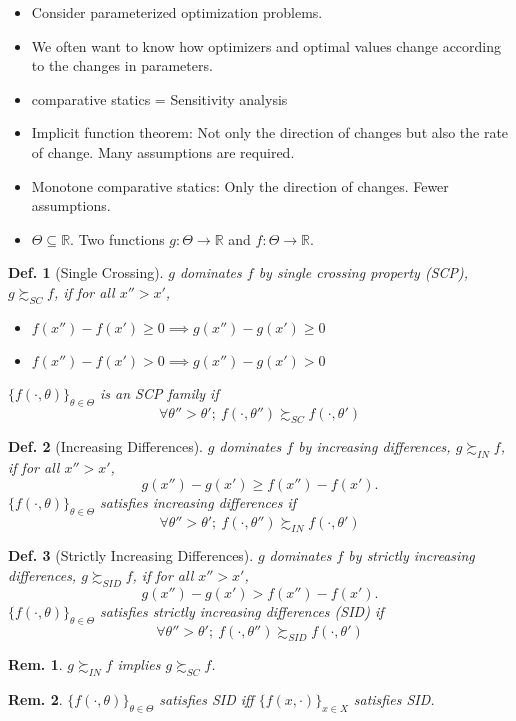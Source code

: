 \documentclass[11pt,a4paper,dvipdfmx]{article}
\theoremstyle{plain}
\newtheorem{df}{Def.}[section]
\newtheorem{rem}{Rem.}[section]
\newcommand{\R}{\mathbb{R}}
\newcommand{\1}{\mathbbm{1}}
\begin{document}
\begin{itemize}
	\item Consider parameterized optimization problems.
	\item We often want to know how optimizers and optimal values change according to the changes in parameters.
	\item comparative statics = Sensitivity analysis
	\item Implicit function theorem: Not only the direction of changes but also the rate of change. Many assumptions are required.
	\item Monotone comparative statics: Only the direction of changes. Fewer assumptions.
	\item $\Theta \subseteq \R$. Two functions $g: \Theta \to \R$ and $f: \Theta \to \R$.
\end{itemize}

\begin{df}[Single Crossing]
	$g$ dominates $f$ by single crossing property (SCP), $g \succsim_{SC} f$, if for all $x'' > x'$,
	\begin{itemize}
		\item $f(x'') - f(x') \geq 0 \implies g(x'') - g(x') \geq 0$
		\item $f(x'') - f(x') > 0 \implies g(x'') - g(x') > 0$
	\end{itemize}
	
	$\{f(\cdot, \theta)\}_{\theta \in \Theta}$ is an SCP family if
	$$
	\forall \theta'' > \theta' ; \ f(\cdot, \theta'') \succsim_{SC} f(\cdot, \theta')
	$$
\end{df}

\begin{df}[Increasing Differences]
	$g$ dominates $f$ by increasing differences, $g \succsim_{IN} f$, if for all $x'' > x'$, $$g(x'') - g(x') \geq f(x'') - f(x').$$
	$\{f(\cdot, \theta)\}_{\theta \in \Theta}$ satisfies increasing differences if
	$$
	\forall \theta'' > \theta' ; \ f(\cdot, \theta'') \succsim_{IN} f(\cdot, \theta')
	$$
\end{df}
\begin{df}[Strictly Increasing Differences]
	$g$ dominates $f$ by strictly increasing differences, $g \succsim_{SID} f$, if for all $x'' > x'$, $$g(x'') - g(x') > f(x'') - f(x').$$
	$\{f(\cdot, \theta)\}_{\theta \in \Theta}$ satisfies strictly increasing differences (SID) if
	$$
	\forall \theta'' > \theta' ; \ f(\cdot, \theta'') \succsim_{SID} f(\cdot, \theta')
	$$
\end{df}

\begin{rem}
	$g \succsim_{IN} f$ implies $g \succsim_{SC} f$.
\end{rem}
\begin{rem}
	$\{f(\cdot, \theta)\}_{\theta \in \Theta}$ satisfies SID iff $\{f(x, \cdot)\}_{x \in X}$ satisfies SID.
\end{rem}
\end{document}
